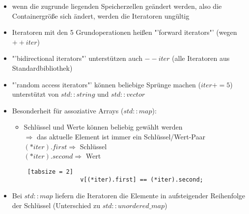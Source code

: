 \documentclass{article}
\begin{document}
\begin{itemize}
\begin{lstlisting} [tabsize = 2]
				// Abkuerzung in C++: rang-based for-loop
				for (int & element : v) {
					int current = element;  // lesen
					element = new_value;  // schreiben
				}
			}
		\end{lstlisting}
		\item wenn die zugrunde liegenden Speicherzellen geändert werden, also die Containergröße sich ändert, werden die Iteratoren ungültig
		\item Iteratoren mit den 5 Grundoperationen heißen "'forward iterators"' (wegen $++iter$)
		\item "'bidirectional iterators"' unterstützen auch $--iter$ (alle Iteratoren aus Standardbibliothek)
		\item "'random access iterators"' können beliebige Sprünge machen ($iter+=5$) \\
		unterstützt von $std::string$ und $std::vector$
		\item Besonderheit für assoziative Arrays ($std::map$):
		\begin{itemize}
			\item Schlüssel und Werte können beliebig gewählt werden \\
			$\Rightarrow$ das aktuelle Element ist immer ein Schlüssel/Wert-Paar \\
			$(*iter).first \Rightarrow$ Schlüssel \\
			$(*iter).second \Rightarrow$ Wert
			\begin{lstlisting} [tabsize = 2]
				v[(*iter).first] == (*iter).second;
			\end{lstlisting}
		\end{itemize}
		\item Bei $std::map$ liefern die Iteratoren die Elemente in aufsteigender Reihenfolge der Schlüssel (Unterschied zu $std::unordered\_map$)
	\end{itemize}
	
	
	
	
\end{document}
